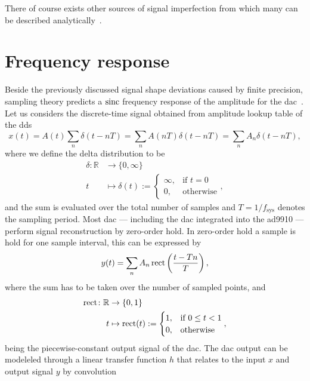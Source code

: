 There of course exists other sources of signal imperfection from which
many can be described analytically~\cite{Goldberg1994}. 

\section{Frequency response}

Beside the previously discussed signal shape deviations caused by finite
precision, sampling theory predicts a $\operatorname{sinc}$ frequency response of
the amplitude for the \gls{dac}~\cite{Oppenheim1997}. Let us considers the
discrete-time signal obtained from amplitude lookup table of the \gls{dds}
\begin{equation}
  x(t)
  =A(t)\sum_n \delta(t-nT)
  =\sum_n A(nT)\delta(t-nT)
  =\sum_n A_n\delta(t-nT),
  \label{eq:signal_sampled}
\end{equation}
where we define the delta distribution to be
\begin{align}
  \delta\colon\mathbb{R} &\to \{0,\infty\}\\
  t &\mapsto \delta(t):=
  \begin{cases}
    \infty, & \text{if }t=0\\
    0, & \text{otherwise}
  \end{cases},
  \label{eq:delta}
\end{align}
and the sum is evaluated over the total number of samples and
$T=1/f_\text{sys}$ denotes the sampling period. Most \gls{dac} --- including
the \gls{dac} integrated into the \gls{ad9910} --- perform signal
reconstruction by zero-order hold. In zero-order hold a sample is hold for
one sample interval, this can be expressed by
\begin{equation}
  y(t)
  =
  \sum_n A_n\operatorname{rect}\left(\frac{t-Tn}{T}\right),
  \label{eq:signal_reconstructed}
\end{equation}
where the sum has to be taken over the number of sampled points, and
\begin{align}
  \operatorname{rect}\colon\mathbb{R} &\to \{0,1\}\\
  t &\mapsto \operatorname{rect}(t):=
  \begin{cases}
    1, & \text{if }0\leq t<1\\
    0, & \text{otherwise}
  \end{cases},
  \label{eq:rect}
\end{align}
being the piecewise-constant output signal of the \gls{dac}. The \gls{dac}
output can be modeleled through a linear transfer function $h$ that relates
to the input $x$ and output signal $y$ by convolution
